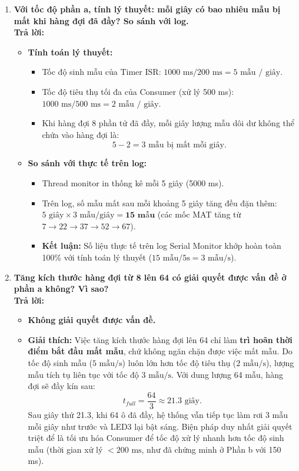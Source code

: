 \begin{enumerate}[label=(\alph*)]
    \item \textbf{Với tốc độ phần a, tính lý thuyết: mỗi giây có bao nhiêu mẫu bị mất khi hàng đợi đã đầy? So sánh với log.} \\
    \textbf{Trả lời:}
    \begin{itemize}
        \item \textbf{Tính toán lý thuyết:}
        \begin{itemize}
            \item Tốc độ sinh mẫu của Timer ISR: $1000\text{ ms} / 200\text{ ms} = 5\text{ mẫu / giây}$.
            \item Tốc độ tiêu thụ tối đa của Consumer (xử lý 500 ms): $1000\text{ ms} / 500\text{ ms} = 2\text{ mẫu / giây}$.
            \item Khi hàng đợi 8 phần tử đã đầy, mỗi giây lượng mẫu dôi dư không thể chứa vào hàng đợi là:
            $$5 - 2 = 3\text{ mẫu bị mất mỗi giây.}$$
        \end{itemize}
        \item \textbf{So sánh với thực tế trên log:}
        \begin{itemize}
            \item Thread monitor in thống kê mỗi 5 giây (5000 ms).
            \item Trên log, số mẫu mất sau mỗi khoảng 5 giây tăng đều đặn thêm: $5\text{ giây} \times 3\text{ mẫu/giây} = \mathbf{15\text{ mẫu}}$ (các mốc MAT tăng từ $7 \rightarrow 22 \rightarrow 37 \rightarrow 52 \rightarrow 67$).
            \item \textbf{Kết luận:} Số liệu thực tế trên log Serial Monitor khớp hoàn toàn 100\% với tính toán lý thuyết ($15\text{ mẫu} / 5\text{s} = 3\text{ mẫu/s}$).
        \end{itemize}
    \end{itemize}
    
    \item \textbf{Tăng kích thước hàng đợi từ 8 lên 64 có giải quyết được vấn đề ở phần a không? Vì sao?} \\
    \textbf{Trả lời:}
    \begin{itemize}
        \item \textbf{Không giải quyết được vấn đề.}
        \item \textbf{Giải thích:} Việc tăng kích thước hàng đợi lên 64 chỉ làm \textbf{trì hoãn thời điểm bắt đầu mất mẫu}, chứ không ngăn chặn được việc mất mẫu. Do tốc độ sinh mẫu ($5\text{ mẫu/s}$) luôn lớn hơn tốc độ tiêu thụ ($2\text{ mẫu/s}$), lượng mẫu tích tụ liên tục với tốc độ $3\text{ mẫu/s}$. Với dung lượng 64 mẫu, hàng đợi sẽ đầy kín sau:
        $$t_{full} = \frac{64}{3} \approx 21.3\text{ giây.}$$
        Sau giây thứ 21.3, khi 64 ô đã đầy, hệ thống vẫn tiếp tục làm rơi 3 mẫu mỗi giây như trước và LED3 lại bật sáng. Biện pháp duy nhất giải quyết triệt để là tối ưu hóa Consumer để tốc độ xử lý nhanh hơn tốc độ sinh mẫu (thời gian xử lý $< 200\text{ ms}$, như đã chứng minh ở Phần b với 150 ms).
    \end{itemize}
\end{enumerate}

